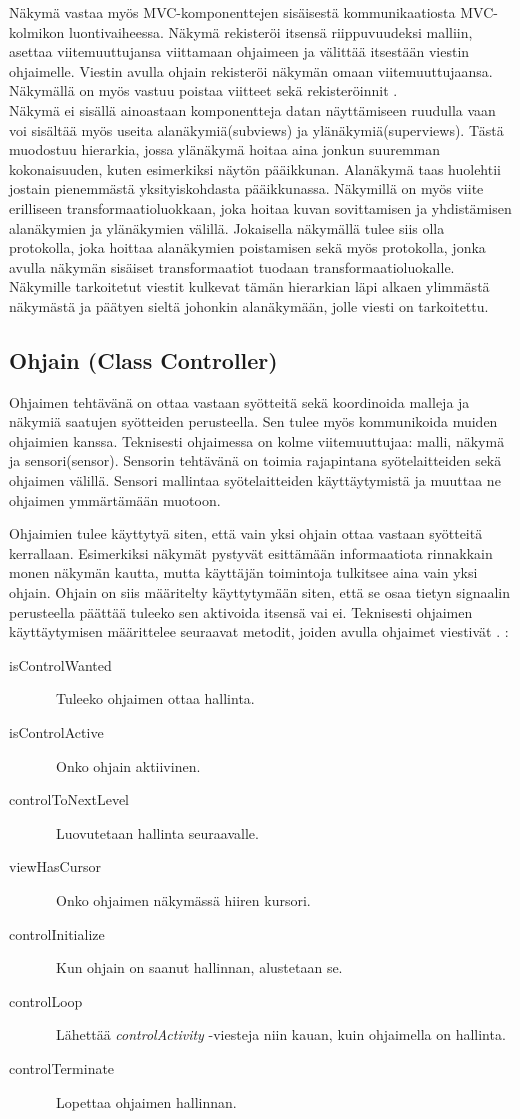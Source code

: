 \documentclass[finnish,utf8,nonumbib,palatino,kandi]{gradu2}
\begin{document}
Näkymä vastaa myös MVC-komponenttejen sisäisestä kommunikaatiosta MVC-kolmikon luontivaiheessa. Näkymä rekisteröi itsensä  riippuvuudeksi malliin, asettaa viitemuuttujansa viittamaan ohjaimeen ja välittää itsestään viestin ohjaimelle. Viestin avulla ohjain rekisteröi näkymän omaan viitemuuttujaansa. Näkymällä on myös vastuu poistaa viitteet sekä rekisteröinnit \cite{Burbeck}. \\
Näkymä ei sisällä ainoastaan komponentteja datan näyttämiseen ruudulla vaan voi sisältää myös useita alanäkymiä(subviews) ja ylänäkymiä(superviews). Tästä muodostuu hierarkia, jossa ylänäkymä hoitaa aina jonkun suuremman kokonaisuuden, kuten esimerkiksi näytön pääikkunan. Alanäkymä taas huolehtii jostain pienemmästä yksityiskohdasta pääikkunassa. Näkymillä on myös viite erilliseen transformaatioluokkaan, joka hoitaa kuvan sovittamisen ja yhdistämisen alanäkymien ja ylänäkymien välillä. Jokaisella näkymällä tulee siis olla protokolla, joka hoittaa alanäkymien poistamisen sekä myös protokolla, jonka avulla näkymän sisäiset transformaatiot tuodaan transformaatioluokalle. Näkymille tarkoitetut viestit kulkevat tämän hierarkian läpi alkaen ylimmästä näkymästä ja päätyen sieltä johonkin alanäkymään, jolle viesti on tarkoitettu. \cite{Krasner:desc} 

\subsection{Ohjain (Class Controller)}
Ohjaimen tehtävänä on ottaa vastaan syötteitä sekä koordinoida malleja ja näkymiä saatujen syötteiden perusteella. Sen tulee myös kommunikoida muiden ohjaimien kanssa. Teknisesti ohjaimessa on kolme viitemuuttujaa: malli, näkymä ja sensori(sensor). Sensorin tehtävänä on toimia rajapintana syötelaitteiden sekä ohjaimen välillä. Sensori mallintaa syötelaitteiden käyttäytymistä ja muuttaa ne ohjaimen ymmärtämään muotoon. 

Ohjaimien tulee käyttytyä siten, että vain yksi ohjain ottaa vastaan syötteitä kerrallaan. Esimerkiksi näkymät pystyvät esittämään informaatiota rinnakkain monen näkymän kautta, mutta käyttäjän toimintoja tulkitsee aina vain yksi ohjain. Ohjain on siis määritelty käyttytymään siten, että se osaa tietyn signaalin perusteella päättää tuleeko sen aktivoida itsensä vai ei. Teknisesti ohjaimen käyttäytymisen määrittelee seuraavat metodit, joiden avulla ohjaimet viestivät \cite{Krasner:desc}. : 
\begin{description}
\item[isControlWanted] \ Tuleeko ohjaimen ottaa hallinta.  
\item[isControlActive] \ Onko ohjain aktiivinen. 
\item[controlToNextLevel] \ Luovutetaan hallinta seuraavalle. 
\item[viewHasCursor] \ Onko ohjaimen näkymässä hiiren kursori. 
\item[controlInitialize] \ Kun ohjain on saanut hallinnan, alustetaan se. 
\item[controlLoop] \ Lähettää \emph{controlActivity} -viesteja niin kauan, kuin ohjaimella on hallinta. 
\item[controlTerminate] \ Lopettaa ohjaimen hallinnan.
\end{description}
\end{document}
